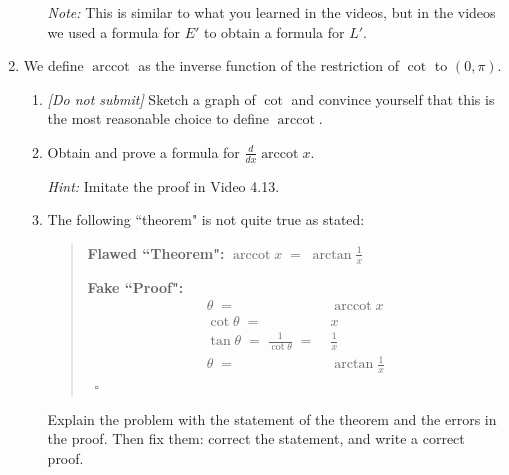 \documentclass[12pt]{exam}
\newcommand {\DS} [1] {${\displaystyle #1}$}
\newcommand{\vv}{\vspace{.1cm}}
\DeclareMathOperator{\arccot}{arccot}
\begin{document}
\begin{enumerate}
\begin{enumerate}
			\emph{Note:}  This is similar to what you learned in the videos, but in the videos we used a formula for $E'$ to obtain a formula for $L'$.
	\end{enumerate}

\vv

\item  We define $\arccot$ as the inverse function of the restriction of $\cot$ to \DS{(0, \pi)}.
	\begin{enumerate}
		\item \emph{[Do not submit]}  Sketch a graph of $\cot$ and convince yourself that this is the most reasonable choice to define $\arccot$.
		\item   Obtain and prove a formula for \DS{\frac{d}{dx} \arccot x}.
		
			\emph{Hint:}  Imitate the proof in Video 4.13.

		\item The following ``theorem" is not quite true as stated:
		
			\begin{quotation}
			{\bf Flawed ``Theorem":}   \DS{ \arccot x \; = \; \arctan \frac{1}{x} }
			
			{\bf Fake ``Proof":}   \vspace{-.5cm}
				\begin{align*}
					\theta \; =& \; \arccot x \\
					 \cot \theta \; =& \;  x \\
					 \tan \theta \; = \; \frac{1}{\cot \theta} \; =& \; \frac{1}{x} \\
					 \theta  \; =& \;  \arctan \frac{1}{x}  
				\end{align*}
				\ \hfill $\square$
			\end{quotation}

	Explain the problem with the statement of the theorem and the errors in the proof.  Then fix them: correct the statement, and write a correct proof.
	\end{enumerate}


\end{enumerate}
\end{document}
